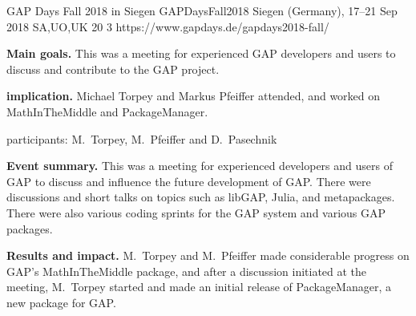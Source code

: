 \begin{event}{GAP Days Fall 2018 in Siegen}
  {GAPDaysFall2018}
  {Siegen (Germany), 17--21 Sep 2018}
  {SA,UO,UK}
  {20}
  {3}
  {https://www.gapdays.de/gapdays2018-fall/}
  
\textbf{Main goals.} This was a meeting for experienced GAP developers and users
to discuss and contribute to the GAP project.

\textbf{\ODK implication.} Michael Torpey and Markus Pfeiffer attended, and
worked on MathInTheMiddle and PackageManager.

\ODK participants: M.~Torpey, M.~Pfeiffer and D.~Pasechnik

\textbf{Event summary.} This was a meeting for experienced developers and users
of GAP to discuss and influence the future development of GAP.  There were
discussions and short talks on topics such as libGAP, Julia, and metapackages.
There were also various coding sprints for the GAP system and various GAP
packages.

\textbf{Results and impact.} M.~Torpey and M.~Pfeiffer made considerable
progress on GAP's MathInTheMiddle package, and after a discussion initiated at
the meeting, M.~Torpey started and made an initial release of PackageManager, a
new package for GAP.

\end{event}

